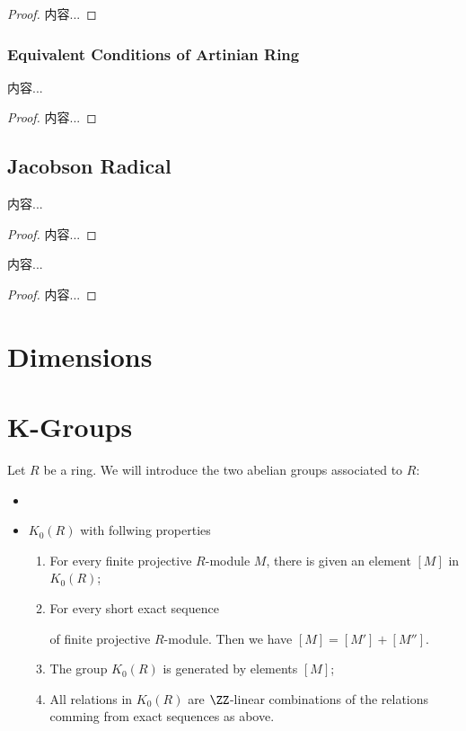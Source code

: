 \documentclass[Total.tex]{subfiles}
\begin{document}
		\begin{proof}
			内容...
		\end{proof}
		\subsubsection{Equivalent Conditions of Artinian Ring}
		\begin{lemma}
			内容...
		\end{lemma}
		\begin{proof}
			内容...
		\end{proof}
		
		\subsection{Jacobson Radical}
		\begin{lemma}
			内容...
		\end{lemma}
		\begin{proof}
			内容...
		\end{proof}
		
		\begin{lemma}
			内容...
		\end{lemma}
		\begin{proof}
			内容...
		\end{proof}
		
		\section{Dimensions}
		\section{K-Groups}
		
		\begin{Def}
			Let $R$ be a ring. We will introduce the two abelian groups associated to $R$:
			
			\begin{itemize}
				\item 
				\item $K_0(R)$ with follwing properties
				
				\begin{enumerate}
					\item For every finite projective $R$-module $M$, there is given an element $[M]$ in $K_0(R)$;
					\item For every short exact sequence
					\begin{center}
					\end{center}
					of finite projective $R$-module. Then we have $[M]=[M']+[M'']$.
					
					\item The group $K_0(R)$ is generated by elements $[M]$;
					\item All relations in $K_0(R)$ are $\ZZ$-linear combinations of the relations comming from exact sequences as above.
				\end{enumerate}
			\end{itemize}
		\end{Def}
		
\end{document}
